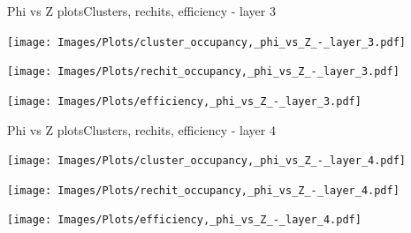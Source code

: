 \documentclass{beamer}
\begin{document}
\begin{frame}{Phi vs Z plots}{Clusters, rechits, efficiency - layer 3}
  \hspace{0.01\textwidth}%
  \begin{minipage}{0.32\textwidth}
    \centering
    \texttt{[image: Images/Plots/cluster\_occupancy,\_phi\_vs\_Z\_-\_layer\_3.pdf]}
  \end{minipage}%
  \hspace{0.01\textwidth}%
  \begin{minipage}{0.32\textwidth}
    \centering
    \texttt{[image: Images/Plots/rechit\_occupancy,\_phi\_vs\_Z\_-\_layer\_3.pdf]}
  \end{minipage}
  \vspace*{0.2cm}
  \begin{minipage}{0.32\textwidth}
    \centering
    \texttt{[image: Images/Plots/efficiency,\_phi\_vs\_Z\_-\_layer\_3.pdf]}
  \end{minipage}%
\end{frame}

\begin{frame}{Phi vs Z plots}{Clusters, rechits, efficiency - layer 4}
  \hspace{0.01\textwidth}%
  \begin{minipage}{0.32\textwidth}
    \centering
    \texttt{[image: Images/Plots/cluster\_occupancy,\_phi\_vs\_Z\_-\_layer\_4.pdf]}
  \end{minipage}%
  \hspace{0.01\textwidth}%
  \begin{minipage}{0.32\textwidth}
    \centering
    \texttt{[image: Images/Plots/rechit\_occupancy,\_phi\_vs\_Z\_-\_layer\_4.pdf]}
  \end{minipage}
  \vspace*{0.2cm}
  \begin{minipage}{0.32\textwidth}
    \centering
    \texttt{[image: Images/Plots/efficiency,\_phi\_vs\_Z\_-\_layer\_4.pdf]}
  \end{minipage}%
\end{frame}
\end{document}

